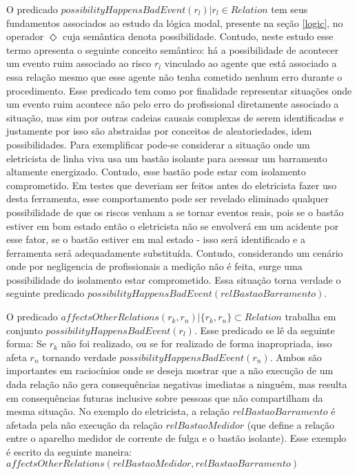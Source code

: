 O predicado $possibilityHappensBadEvent(r_l) | r_l \in Relation $ tem seus fundamentos associados ao estudo da lógica modal, presente na seção \ref{logic}, no operador $\Diamond$ cuja semântica denota possibilidade. Contudo, neste estudo esse termo apresenta o seguinte conceito semântico: há a possibilidade de acontecer um evento ruim associado ao risco $r_l$ vinculado ao agente que está associado a essa relação mesmo que esse agente não tenha cometido nenhum erro durante o procedimento. Esse predicado tem como por finalidade representar situações onde um evento ruim acontece não pelo erro do profissional diretamente associado a situação, mas sim por outras cadeias causais complexas de serem identificadas e justamente por isso são abstraidas por conceitos de aleatoriedades, idem possibilidades. Para exemplificar pode-se considerar a situação onde um eletricista de linha viva usa um bastão isolante para acessar um barramento altamente energizado. Contudo, esse bastão pode estar com isolamento comprometido. Em testes que deveriam ser feitos antes do eletricista fazer uso desta ferramenta, esse comportamento pode ser revelado eliminado qualquer possibilidade de que os riscos venham a se tornar eventos reais, pois se o bastão estiver em bom estado então o eletricista não se envolverá em um acidente por esse fator, se o bastão estiver em mal estado - isso será identificado e a ferramenta será adequadamente substituída. Contudo, considerando um cenário onde por negligencia de profissionais a medição não é feita, surge uma possibilidade do isolamento estar comprometido. Essa situação torna verdade o seguinte predicado $possibilityHappensBadEvent(relBastaoBarramento)$.

O predicado $affectsOtherRelations(r_k,r_n) | \{ r_k, r_n\} \subset Relation $ trabalha em conjunto $possibilityHappensBadEvent(r_l)$. Esse predicado se lê da seguinte forma: Se $r_k$ não foi realizado, ou se for realizado de forma inapropriada, isso afeta  $r_n$ tornando verdade 
$possibilityHappensBadEvent(r_n)$. Ambos são importantes em raciocínios onde se deseja mostrar que a não execução de um dada relação não gera consequências negativas imediatas a ninguém, mas resulta em consequências futuras inclusive sobre pessoas que não compartilham da mesma situação. No exemplo do eletricista, a relação $relBastaoBarramento$ é afetada pela não execução da relação $relBastaoMedidor$ (que define a relação entre o aparelho medidor de corrente de fulga e o bastão isolante). Esse exemplo é escrito da seguinte maneira:$affectsOtherRelations(relBastaoMedidor,relBastaoBarramento)$

